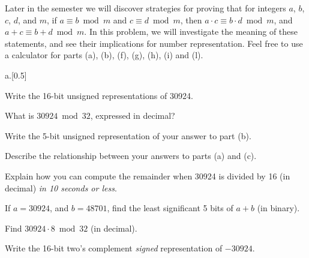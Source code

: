 \item[10] Later in the semester we will discover strategies for proving that for integers $a$, $b$, $c$, $d$, and $m$, if $a\equiv b\bmod{m}$ and $c\equiv d\bmod{m}$, then $a\cdot c\equiv b\cdot d\bmod{m}$, and $a+c\equiv b+d\bmod{m}$. In this problem, we will  investigate the meaning of these statements, and see their implications for number representation. Feel free to use a calculator for parts (a), (b), (f), (g), (h), (i) and (l).

\begin{question}{a.}[0.5]
    \item[0.5] Write the 16-bit unsigned representations of 30924.
    \begin{Questions}
    \vfill
    \end{Questions}
    \item[0.5] What is $30924\bmod 32$, expressed in decimal?
    \begin{Questions}
    \vfill
    \end{Questions}
    \item[0.5] Write the 5-bit unsigned representation of your answer to part (b).
    \begin{Questions}
    \vfill
    \end{Questions}
    \item[0.5] Describe the relationship between your answers to parts (a) and (c).
    \begin{Questions}
    \vfill
    \end{Questions}
    \item[1] Explain how you can compute the remainder when 30924 is divided by 16 (in decimal) \emph{in 10 seconds or less}.
    \begin{Questions}
    \vfill\vfill\eject
    \end{Questions}
    \item[0.5] If $a = 30924$, and $b= 48701$, find the least significant 5 bits of $a+b$ (in binary).
    \begin{Questions}
    \vfill
    \end{Questions}
    \item[0.5] Find $30924 \cdot 8\bmod{32}$ (in decimal).
    \begin{Questions}
    \vfill
    \end{Questions}
    \item[1]
    Write the 16-bit two's complement {\em signed} representation of $-30924$.
    \begin{Questions}
    \vfill
    \end{Questions}

\end{question}
